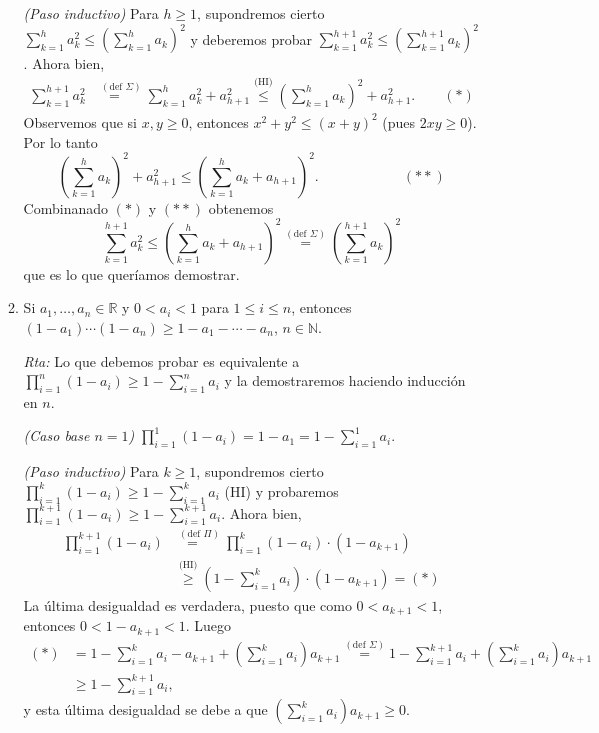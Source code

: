 \documentclass[12pt,spanish,makeidx]{amsbook}
\newcommand{\rta}{\noindent\textit{Rta: }}
\begin{document}
\begin{enumerate}
\begin{enumerate}
			\textit{(Paso inductivo) }  Para  $h \ge 1$,  supondremos cierto $\sum_{k=1}^h a_{k}^{2}\leq \left(\sum_{k=1}^h a_{k}\right)^{2}$ y deberemos  probar $\sum_{k=1}^{h+1} a_{k}^{2}\leq \left(\sum_{k=1}^{h+1} a_{k}\right)^{2}$.  Ahora bien,
			\begin{align*}
			\sum_{k=1}^{h+1} a_{k}^{2} &\overset{(\text{def } \Sigma)}{=\quad} \sum_{k=1}^h a_{k}^{2} + a_{h+1}^{2} \overset{\text{(HI)}}{\leq} \left(\sum_{k=1}^h a_{k}\right)^{2} + a_{h+1}^{2}. \qquad (*)
			\end{align*}
			Observemos que si $x,y \ge 0$,  entonces $x^2 + y^2 \leq (x+y)^2$ (pues $2xy \ge 0$). Por lo tanto 
			\begin{equation*}
				 \left(\sum_{k=1}^h a_{k}\right)^{2} + a_{h+1}^{2} \leq  \left(\sum_{k=1}^h a_{k}+a_{h+1}\right)^{2}. \qquad\qquad\qquad (**)
			\end{equation*}
			Combinanado $(*)$ y $(**)$ obtenemos
			\begin{equation*}
				\sum_{k=1}^{h+1} a_{k}^{2} \leq \left(\sum_{k=1}^h a_{k}+a_{h+1}\right)^{2} \overset{(\text{def } \Sigma)}{=} \left(\sum_{k=1}^{h+1} a_{k}\right)^{2}
			\end{equation*}
			que es lo que queríamos demostrar. 
			
			\item Si $a_1,\dots,a_n \in \mathbb R$ y $0<a_i<1$ para $1 \le i\le n$, entonces $(1-a_1)\cdots(1-a_n)\ge 1-a_1-\cdots -a_n$, $n\in \mathbb N$.
			
			\rta Lo que debemos probar es equivalente a $\prod_{i=1}^{n} (1-a_i) \ge 1 - \sum_{i=1}^{n} a_i$ y la demostraremos haciendo inducción en $n$.  
			
			\textit{(Caso base $n=1$) } $\prod_{i=1}^{1} (1-a_i) = 1-a_1 = 1 - \sum_{i=1}^{1} a_i$.
			
			\textit{(Paso inductivo) }  Para  $k \ge 1$,  supondremos cierto  $\prod_{i=1}^{k} (1-a_i) \ge 1 - \sum_{i=1}^{k} a_i$ (HI) y probaremos  $\prod_{i=1}^{k+1} (1-a_i) \ge 1 - \sum_{i=1}^{k+1} a_i$. Ahora bien, 
			\begin{align*}
			\prod_{i=1}^{k+1} (1-a_i) &\overset{(\text{def } \Pi)}{=\quad} \prod_{i=1}^{k} (1-a_i)\cdot (1-a_{k+1})\\
			&\overset{\text{(HI)}}{\ge}  (1 - \sum_{i=1}^{k} a_i)\cdot (1-a_{k+1}) =(*)
			\end{align*}
			La última desigualdad es verdadera, puesto  que como $0<a_{k+1}<1$, entonces $0<1-a_{k+1}<1$. 
			Luego
			\begin{align*}
				(*)&= 1 - \sum_{i=1}^{k} a_i -a_{k+1} +  (\sum_{i=1}^{k} a_i)a_{k+1} \overset{(\text{def } \Sigma)}{=} 1 - \sum_{i=1}^{k+1} a_i +  (\sum_{i=1}^{k} a_i)a_{k+1} \\
				&\ge  1 - \sum_{i=1}^{k+1} a_i,
			\end{align*}
			y  esta última desigualdad se debe a que $(\sum_{i=1}^{k} a_i)a_{k+1} \ge 0$.
		\end{enumerate}
		

\end{enumerate}
\end{document}
